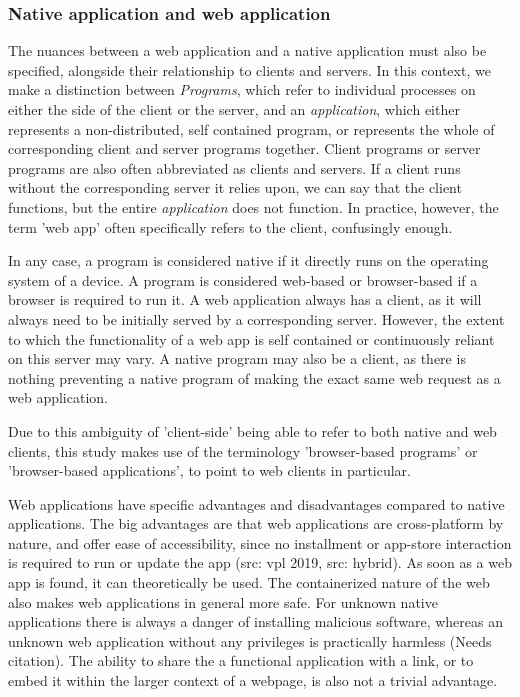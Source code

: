 \subsubsection*{Native application and web application}

The nuances between a web application and a native application must also be specified, alongside their relationship to clients and servers. 
In this context, we make a distinction between \emph{Programs}, which refer to individual processes on either the side of the client or the server, and an \emph{application}, which either represents a non-distributed, self contained program, or represents the whole of corresponding client and server programs together.
Client programs or server programs are also often abbreviated as clients and servers.  
If a client runs without the corresponding server it relies upon, we can say that the client functions, but the entire \emph{application} does not function. 
In practice, however, the term 'web app' often specifically refers to the client, confusingly enough.

In any case, a program is considered native if it directly runs on the operating system of a device.
A program is considered web-based or browser-based if a browser is required to run it. 
A web application always has a client, as it will always need to be initially served by a corresponding server.
However, the extent to which the functionality of a web app is self contained or continuously reliant on this server may vary.
A native program may also be a client, as there is nothing preventing a native program of making the exact same web request as a web application. 

Due to this ambiguity of 'client-side' being able to refer to both native and web clients, this study makes use of the terminology 'browser-based programs' or 'browser-based applications', to point to web clients in particular. 

Web applications have specific advantages and disadvantages compared to native applications. 
The big advantages are that web applications are cross-platform by nature, and offer ease of accessibility, since no installment or app-store interaction is required to run or update the app (src: vpl 2019, src: hybrid).
As soon as a web app is found, it can theoretically be used.
The containerized nature of the web also makes web applications in general more safe. 
For unknown native applications there is always a danger of installing malicious software, whereas an unknown web application without any privileges is practically harmless (Needs citation). 
The ability to share the a functional application with a link, or to embed it within the larger context of a webpage, is also not a trivial advantage.

